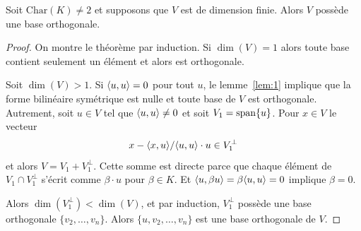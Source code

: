 \begin{theorem}
  \label{thr:5}
  Soit $\mathrm{Char}(K)\neq 2$
  et supposons que $V$
  est de dimension finie. Alors $V$ possède une base orthogonale.
\end{theorem}


\begin{proof}
  On montre le théorème par induction. Si $\dim(V) = 1$ alors toute base contient seulement un élément et alors est orthogonale. 

Soit $\dim(V) >1$.  Si $\langle {u,u} \rangle = 0$ pour tout $u$, le lemme~\ref{lem:1} implique que la forme bilinéaire symétrique est nulle et toute base de $V$  est orthogonale.  
Autrement, soit $u \in V$ tel que $\langle {u,u} \rangle \neq 0$ et soit $V_1 = \operatorname{span}\{u\}$. Pour  $x \in V$ le vecteur 
\begin{displaymath}
  x - \langle {x,u} \rangle/\langle {u,u} \rangle \cdot  u \in V_1^\perp
\end{displaymath}
et alors $V = V_1 + V_1^\perp$. Cette somme est directe parce que chaque élément de $V_1 \cap V_1^\perp$ s'écrit comme $\beta \cdot u$ pour $\beta \in K$. Et $\langle {u,\beta u} \rangle = \beta \langle {u,u} \rangle = 0$ implique $\beta = 0$. 

Alors $\dim(V_1^\perp) < \dim(V)$, et par induction, $V_1^\perp$ possède une base orthogonale $\{v_2,\dots,v_n\}$. Alors $\{u,v_2,\dots,v_n\}$ est une base orthogonale de $V$. 
\end{proof}  




